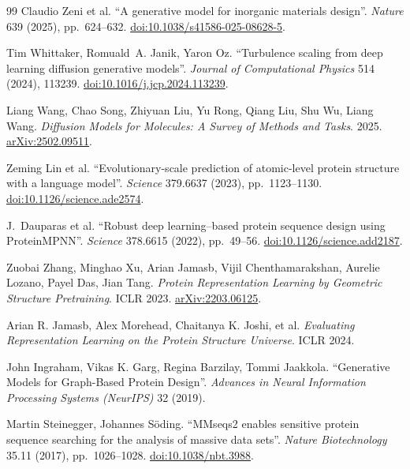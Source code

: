 \documentclass[12pt,a4paper,twoside]{report}
\begin{document}
\begin{thebibliography}{99}
Claudio Zeni et al.
``A generative model for inorganic materials design''.
\textit{Nature} 639 (2025), pp.~624--632.
\href{https://doi.org/10.1038/s41586-025-08628-5}{doi:10.1038/s41586-025-08628-5}.

Tim Whittaker, Romuald~A. Janik, Yaron Oz.
``Turbulence scaling from deep learning diffusion generative models''.
\textit{Journal of Computational Physics} 514 (2024), 113239.
\href{https://doi.org/10.1016/j.jcp.2024.113239}{doi:10.1016/j.jcp.2024.113239}.


Liang Wang, Chao Song, Zhiyuan Liu, Yu Rong, Qiang Liu, Shu Wu, Liang Wang.
\textit{Diffusion Models for Molecules: A Survey of Methods and Tasks}. 2025.
\href{https://arxiv.org/abs/2502.09511}{arXiv:2502.09511}.


Zeming Lin et al.
``Evolutionary-scale prediction of atomic-level protein structure with a language model''.
\textit{Science} 379.6637 (2023), pp.~1123--1130.
\href{https://doi.org/10.1126/science.ade2574}{doi:10.1126/science.ade2574}.

J.~Dauparas et al.
``Robust deep learning--based protein sequence design using ProteinMPNN''.
\textit{Science} 378.6615 (2022), pp.~49--56.
\href{https://doi.org/10.1126/science.add2187}{doi:10.1126/science.add2187}.

Zuobai Zhang, Minghao Xu, Arian Jamasb, Vijil Chenthamarakshan, Aurelie Lozano, Payel Das, Jian Tang.
\textit{Protein Representation Learning by Geometric Structure Pretraining}. ICLR 2023.
\href{https://arxiv.org/abs/2203.06125}{arXiv:2203.06125}.

Arian R. Jamasb, Alex Morehead, Chaitanya K. Joshi, et al.
\textit{Evaluating Representation Learning on the Protein Structure Universe}. ICLR 2024.

John Ingraham, Vikas K. Garg, Regina Barzilay, Tommi Jaakkola.
``Generative Models for Graph-Based Protein Design''.
\textit{Advances in Neural Information Processing Systems (NeurIPS)} 32 (2019).

Martin Steinegger, Johannes S\"oding.
``MMseqs2 enables sensitive protein sequence searching for the analysis of massive data sets''.
\textit{Nature Biotechnology} 35.11 (2017), pp.~1026--1028.
\href{https://doi.org/10.1038/nbt.3988}{doi:10.1038/nbt.3988}.


\end{thebibliography}
\end{document}
